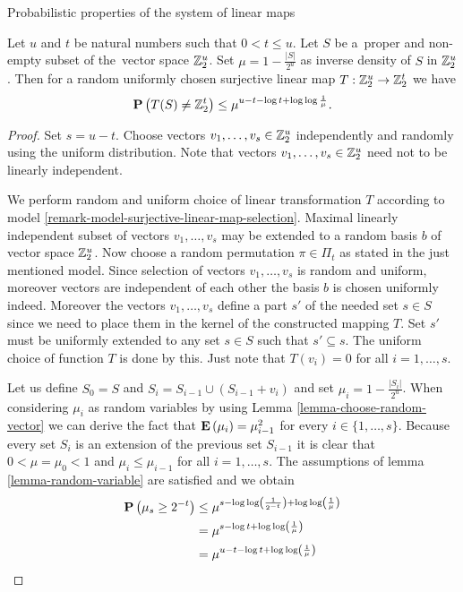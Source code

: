\begin{section}{Probabilistic properties of the system of linear maps}
\begin{theorem}
\label{theorem-linear-function-set-onto}
Let $u$ and $t$ be natural numbers such that $0 < t \leq u$. Let $S$ be a~proper and non-empty subset of the~vector space $\mathbb{Z}_{2}^{u}$. Set $\mu = 1 - \frac{|S|}{2^u}$ as inverse density of $S$ in $\mathbb{Z}_{2}^{u}$. Then for a random uniformly chosen surjective linear map $T: \mathbb{Z}_{2}^{u} \rightarrow \mathbb{Z}_{2}^{t}$ we have
\[
	\mathbf{P}\left(T(S) \neq \mathbb{Z}_{2}^{t}\right) \leq \mu^{u - t - \log t + \log \log \frac{1}{\mu}} \textit{.}
\]
\end{theorem}
\begin{proof}
Set $s = u - t$. Choose vectors $v_1, \dots, v_s \in \mathbb{Z}_{2}^{u}$ independently and randomly using the uniform distribution. Note that vectors $v_1, \dots, v_s \in \mathbb{Z}_{2}^{u}$ need not to be linearly independent.

We perform random and uniform choice of linear transformation $T$ according to model \ref{remark-model-surjective-linear-map-selection}. Maximal linearly independent subset of vectors $v_1, \dots, v_s$ may be extended to a random basis $b$ of vector space $\mathbb{Z}_{2}^{u}$. Now choose a random permutation $\pi \in \Pi_t$ as stated in the just mentioned model. Since selection of vectors $v_1, \dots, v_s$ is random and uniform, moreover vectors are independent of each other the basis $b$ is chosen uniformly indeed. Moreover the vectors $v_1, \dots, v_s$ define a part $s'$ of the needed set $s \in S$ since we need to place them in the kernel of the constructed mapping $T$. Set $s'$ must be uniformly extended to any set $s \in S$ such that $s' \subseteq s$. The uniform choice of function $T$ is done by this. Just note that $T(v_i) = 0$ for all $i = 1, \dots, s$.	

Let us define $S_0 = S$ and $S_i = S_{i - 1} \cup (S_{i - 1} + v_i)$ and set $\mu_i = 1 - \frac{|S_i|}{2 ^ u}$. When considering $\mu_i$ as random variables by using Lemma \ref{lemma-choose-random-vector} we can derive the fact that $\mathbf{E}\left(\mu_i\right) = \mu_{i - 1} ^ 2$ for every $i \in \{1, \dots, s \}$. Because every set $S_i$ is an extension of the previous set $S_{i - 1}$ it is clear that $0 < \mu = \mu_0 < 1$ and $\mu_i \leq \mu_{i - 1}$ for all $i = 1, \dots, s$. The assumptions of lemma \ref{lemma-random-variable} are satisfied and we obtain
\[
\begin{split}
\mathbf{P}\left(\mu_s \geq 2 ^ {-t}\right) 
	& \leq \mu ^ {s - \log \log \left(\frac{1}{2 ^ {-t}}\right) + \log \log \left( \frac{1}{\mu} \right)} \\
	& = \mu ^ {s - \log t + \log \log \left(\frac{1}{\mu}\right)} \\
	& = \mu ^ {u - t - \log t + \log \log \left(\frac{1}{\mu}\right)}
\end{split}
\]


\end{proof}
\end{section}
